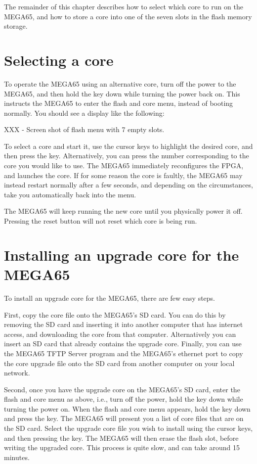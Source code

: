 The remainder of this chapter describes how to select which core to run on the MEGA65, and
how to store a core into one of the seven slots in the flash memory storage.

\section{Selecting a core}

To operate the MEGA65 using an alternative core, turn off the power to the MEGA65, and then hold the
 key down while turning the power back on.  This instructs the MEGA65 to enter the
flash and core menu, instead of booting normally.  You should see a display like the following:

XXX - Screen shot of flash menu with 7 empty slots.

To select a core and start it, use the cursor keys to highlight the desired core, and then press the
 key.  Alternatively, you can press the number corresponding to the core you would
like to use. The MEGA65 immediately reconfigures the FPGA, and launches the core.  If for some reason
the core is faultly, the MEGA65 may instead restart normally after a few seconds, and depending on the
circumstances, take you automatically back into the menu.

The MEGA65 will keep running the new core until you physically power it off.  Pressing the reset button
will not reset which core is being run.

\section{Installing an upgrade core for the MEGA65}

To install an upgrade core for the MEGA65, there are few easy steps.

First, copy the core file onto the MEGA65's SD card.  You can do this by removing the SD card and inserting
it into another computer that has internet access, and downloading the core from that computer. Alternatively
you can insert an SD card that already contains the upgrade core. Finally, you can use the MEGA65 TFTP Server
program and the MEGA65's ethernet port to copy the core upgrade file onto the SD card from another computer
on your local network.

Second, once you have the upgrade core on the MEGA65's SD card, enter the flash and core menu as above,
i.e., turn off the power, hold the  key down while turning the power on.  When the flash
and core menu appears, hold the  key down and press the  key.  The MEGA65
will present you a list of core files that are on the SD card.  Select the upgrade core file you wish to
install using the cursor keys, and then pressing the  key.  The MEGA65 will then erase
the flash slot, before writing the upgraded core.  This process is quite slow, and can take around 15
minutes.

